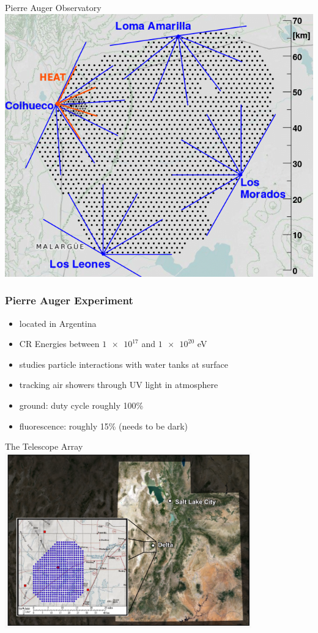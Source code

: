 \documentclass[aspectratio=1610, 9pt]{beamer}
\begin{document}
\begin{frame}{Pierre Auger Observatory}
  \includegraphics[width=\textwidth]{pierre.png}
\end{frame}

\begin{frame}\frametitle{Pierre Auger Experiment}
  \begin{itemize}
    \item located in Argentina
    \item CR Energies between $\num{1e17}$ and $\num{1e20}$ eV
    \item studies particle interactions with water tanks at surface
    \item tracking air showers through UV light in atmosphere
    \item ground: duty cycle roughly 100\%
    \item fluorescence: roughly 15\% (needs to be dark)
  \end{itemize}
\end{frame}

\begin{frame}{The Telescope Array}
  \includegraphics[width=0.8\textwidth]{TCA.png}
\end{frame}
\end{document}
